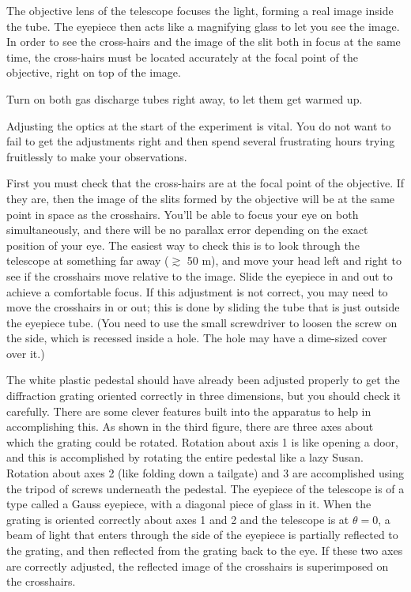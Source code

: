 The objective lens of the telescope focuses the light,
forming a real image inside the tube. The eyepiece then acts
like a magnifying glass to let you see the image. In order
to see the cross-hairs and the image of the slit both in
focus at the same time, the cross-hairs must be located
accurately at the focal point of the objective, right
on top of the image.

\setup

Turn on both gas discharge tubes right away, to let them get warmed up.

Adjusting the optics at the start of the experiment is
vital. You do not want to fail to get the adjustments right
and then spend several frustrating hours trying fruitlessly
to make your observations.

First you must check that the cross-hairs are at the
focal point of the objective. If they are, then the image
of the slits formed by the objective will be at the same point
in space as the crosshairs. You'll be able to focus your eye on both
simultaneously, and there will be no parallax
error depending on the exact position of your eye.
The easiest way to check this is to look through the telescope
at something far away ($\gtrsim$ 50 m), and move your head left
and right to see if the crosshairs move relative to the image.
Slide the eyepiece in and out to achieve a comfortable focus.
If this adjustment is not correct, you may
need to move the crosshairs in or out; this is done
by sliding the tube that is just outside the eyepiece tube.
(You need to use the small screwdriver to loosen the screw
on the side, which is recessed inside a hole. The hole may
have a dime-sized cover over it.)

The white plastic pedestal should have already been adjusted
properly to get the diffraction grating oriented correctly
in three dimensions, but you should check it carefully.
There are some clever features built into the apparatus to help in
accomplishing this. As shown in the third figure, there are three
axes about which the grating could be rotated. Rotation about axis 1 is
like opening a door, and this is accomplished by rotating the entire pedestal like a lazy Susan. Rotation about
axes 2 (like folding down a tailgate) and 3 are accomplished using the
tripod of screws underneath the pedestal. 
The eyepiece of the telescope is of a type called a Gauss eyepiece, with a diagonal piece of
glass in it.  When the grating is oriented correctly about axes 1 and 2 and the telescope
is at $\theta=0$, a beam
of light that enters through the side of the eyepiece is partially reflected to
the grating, and then reflected from the grating back to the eye. If these two axes
are correctly adjusted, the reflected image of the crosshairs is superimposed on the
crosshairs.

